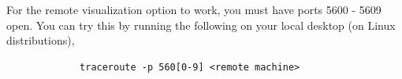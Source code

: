 \documentclass[12pt]{article}
\begin{document}











For the remote visualization option to work, you must have ports 5600
- 5609 open. You can try this by running the following on your local
desktop (on Linux distributions),

\begin{verbatim}        
             traceroute -p 560[0-9] <remote machine>
\end{verbatim}


\end{document}
